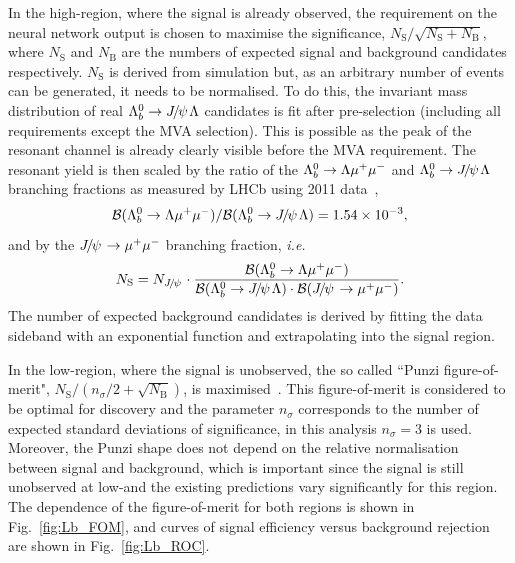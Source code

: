 In the high-\qsq region, where the signal is already observed, the requirement on the neural network output
is chosen to maximise the significance, $N_{\mathrm{S}}/\sqrt{N_{\mathrm{S}}+N_{\mathrm{B}}}$, where
$N_\mathrm{S}$ and $N_\mathrm{B}$ are the numbers of expected signal and background candidates respectively.
$N_\mathrm{S}$ is derived from simulation but, as an arbitrary number of events can be generated, it
needs to be normalised. To do this, the invariant mass distribution of real $\Lb\to\jpsi\Lz$ candidates
is fit after pre-selection (including all requirements except the MVA selection). This is possible as the peak of the resonant
channel is already clearly visible before the MVA requirement. The resonant yield is then scaled by the ratio
of the ${{\Lambda}^0_{b}}\rightarrow{\ensuremath{\Lambda}}{\ensuremath{\mu^+\mu^-}}$ and $\Lb\to\jpsi\Lz$ branching fractions as measured 
by LHCb using 2011 data~\cite{LHCb-PAPER-2013-025}, 
\begin{equation}
\BR(\Lb\to\Lz\mumu) / \BR(\Lb\to\jpsi\Lz) =  1.54 \times 10^{-3},
\end{equation}
\noindent
and by the $\jpsi\to\mumu$ branching fraction, \emph{i.e.}
\begin{equation}
N_\mathrm{S} = N_\jpsi \cdot \frac{\BR(\Lb\to\Lz\mumu)}{\BR(\Lb\to\jpsi\Lz) \cdot \BR(\jpsi\to\mumu) }.
\end{equation}
%
The number of expected background candidates is derived by fitting the data
sideband with an exponential function and extrapolating into the signal region.

In the low-\qsq region, where the signal is unobserved, the so called ``Punzi figure-of-merit",
$N_{\mathrm{S}}/(n_\sigma/2+\sqrt{N_{\mathrm{B}}})$, is maximised~\cite{Punzi:2003bu}.
This figure-of-merit is considered to be optimal for discovery and the parameter $n_\sigma$ corresponds to
the number of expected standard deviations of significance, in this analysis $n_\sigma = 3$ is used.
Moreover, the Punzi shape does not depend on the relative normalisation between signal and background, which
is important since the signal is still unobserved at low-\qsq and the existing predictions vary significantly
for this region. The dependence of the figure-of-merit for both \qsq regions is shown in Fig.~\ref{fig:Lb_FOM}, and curves
of signal efficiency versus background rejection are shown in Fig.~\ref{fig:Lb_ROC}.

